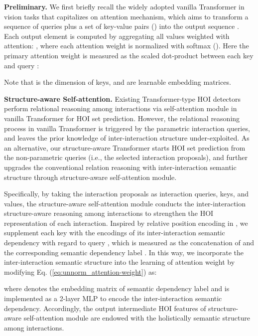 \documentclass[10pt,twocolumn,letterpaper]{article}
\begin{document}
\textbf{Preliminary.}
We first briefly recall the widely adopted vanilla Transformer in vision tasks \cite{li2021contextual,li2021scheduled,pan2020auto,pan2020x} that capitalizes on attention mechanism, which aims to transform a sequence of queries  plus a set of key-value pairs () into the output sequence . Each output element  is computed by aggregating all values weighted with attention: , where each attention weight  is normalized with softmax (). Here the primary attention weight  is measured as the scaled dot-product between each key  and query :
\vspace{-0.05in}

Note that  is the dimension of keys, and  are learnable embedding matrices.

\textbf{Structure-aware Self-attention.}
Existing Transformer-type HOI detectors perform relational reasoning among interactions via self-attention module in vanilla Transformer for HOI set prediction. However, the relational reasoning process in vanilla Transformer is triggered by the parametric interaction queries, and leaves the prior knowledge of inter-interaction structure under-exploited. As an alternative, our structure-aware Transformer starts HOI set prediction from the non-parametric queries (i.e., the selected interaction proposals), and further upgrades the conventional relation reasoning with inter-interaction semantic structure through structure-aware self-attention module.

Specifically, by taking the  interaction proposals  as interaction queries, keys, and values, the structure-aware self-attention module conducts the inter-interaction structure-aware reasoning among interactions to strengthen the HOI representation of each interaction.
Inspired by relative position encoding in \cite{shaw2018self}, we supplement each key  with the encodings of its inter-interaction semantic dependency with regard to query , which is measured as the concatenation of  and the corresponding semantic dependency label . In this way, we incorporate the inter-interaction semantic structure into the learning of attention weight by modifying Eq. (\ref{eq:unnorm_attention-weight}) as:

where  denotes the embedding matrix of semantic dependency label and  is implemented as a 2-layer MLP to encode the inter-interaction semantic dependency.
Accordingly, the output intermediate HOI features  of structure-aware self-attention module are endowed with the holistically semantic structure among interactions.
\end{document}
